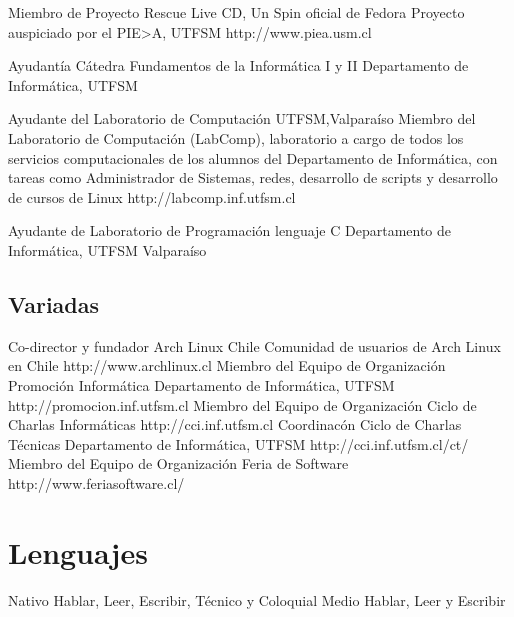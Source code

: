 \documentclass[11pt,a4paper]{moderncv}
\begin{document}
		{Miembro de Proyecto}
		{Rescue Live CD, Un Spin oficial de Fedora}
		{Proyecto auspiciado por el PIE>A, UTFSM}
		{http://www.piea.usm.cl}
		{}

		{Ayudantía Cátedra}
		{Fundamentos de la Informática  I y II }
		{Departamento de Informática, UTFSM}
		{}
		{}

		{Ayudante del Laboratorio de Computación}
		{UTFSM,Valparaíso}
		{Miembro del Laboratorio de Computación (LabComp), laboratorio a cargo de todos los servicios computacionales de los alumnos del Departamento de Informática, con tareas como Administrador de Sistemas, redes, desarrollo de scripts y desarrollo de cursos de Linux}
		{http://labcomp.inf.utfsm.cl}
		{}

		{Ayudante de Laboratorio de Programación}
		{lenguaje C}
		{Departamento de Informática, UTFSM}
		{Valparaíso}
		{}

%

\subsection{Variadas}

		{Co-director y fundador}
		{Arch Linux Chile}
		{Comunidad de usuarios de Arch Linux en Chile}
		{http://www.archlinux.cl}
		{}
		{Miembro del Equipo de Organización}
		{Promoción Informática}
		{Departamento de Informática, UTFSM}
		{http://promocion.inf.utfsm.cl}
		{}
		{Miembro del Equipo de Organización}
		{Ciclo de Charlas Informáticas}
		{http://cci.inf.utfsm.cl}
		{}
		{}
		{Coordinacón}
		{Ciclo de Charlas Técnicas}
		{Departamento de Informática, UTFSM}
		{http://cci.inf.utfsm.cl/ct/}
		{}
		{Miembro del Equipo de Organización}
		{Feria de Software}
		{http://www.feriasoftware.cl/}
		{}
		{}


\section{Lenguajes}
			{Nativo}
			{Hablar, Leer, Escribir, Técnico y Coloquial}
			{Medio}
			{Hablar, Leer y Escribir}
\end{document}
